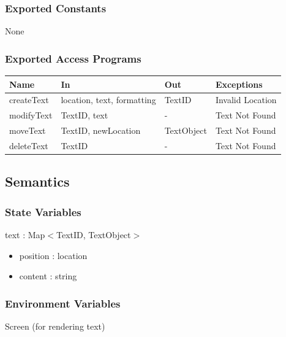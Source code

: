 \documentclass[12pt, titlepage]{article}
\begin{document}
\subsubsection{Exported Constants}
None

\subsubsection{Exported Access Programs}

\begin{center}
\begin{tabular}{p{2cm} p{6cm} p{4cm} p{2cm}}
\hline
\textbf{Name} & \textbf{In} & \textbf{Out} & \textbf{Exceptions} \\
\hline
{createText} & location, text, formatting & TextID & Invalid Location \\
\hline
{modifyText} & TextID, text & - & Text Not Found  \\
\hline
{moveText} & TextID, newLocation & TextObject & Text Not Found \\
\hline
{deleteText} & TextID & - & Text Not Found \\
\hline
\end{tabular}
\end{center}

\subsection{Semantics}

\subsubsection{State Variables}

text : Map$<$TextID, TextObject$>$

\begin{itemize}
\item position : location
\item content : string
\end{itemize}

\subsubsection{Environment Variables}
Screen (for rendering text)

\end{document}
